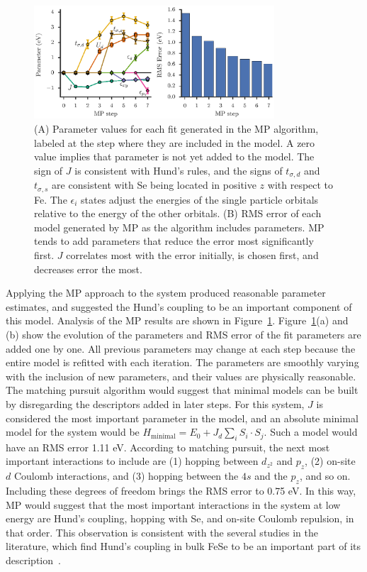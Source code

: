 \begin{figure}
  \centering
  \includegraphics[width=0.8\textwidth]{./Figures/fese.eps}
  \caption{
    \label{fig:fese} 
    (A) Parameter values for each fit generated in the MP algorithm, labeled at the step where they are included in the model. 
    A zero value implies that parameter is not yet added to the model.
    The sign of $J$ is consistent with Hund's rules, and the signs of $t_{\sigma,d}$ and $t_{\sigma,s}$ are consistent with Se being located in positive $z$ with respect to Fe. 
    The $\epsilon_i$ states adjust the energies of the single particle orbitals relative to the energy of the other orbitals.
    (B) RMS error of each model generated by MP as the algorithm includes parameters. 
    MP tends to add parameters that reduce the error most significantly first. 
    $J$ correlates most with the error initially, is chosen first, and decreases error the most.
  }
\end{figure}

Applying the MP approach to the system produced reasonable parameter estimates, and suggested the Hund's coupling to be an important component of this model.
Analysis of the MP results are shown in Figure~\ref{fig:fese}. 
Figure~\ref{fig:fese}(a) and (b) show the evolution of the parameters and RMS error of the fit parameters are added one by one.
All previous parameters may change at each step because the entire model is refitted with  each iteration.
The parameters are smoothly varying with the inclusion of new parameters, and their values are physically reasonable.
The matching pursuit algorithm would suggest that minimal models can be built by disregarding the descriptors added in later steps.
For this system, $J$ is considered the most important parameter in the model, and an absolute minimal model for the system would be $H_\text{minimal} = E_0 + J_d \sum_i S_i \cdot S_j$. 
Such a model would have an RMS error 1.11 eV. 
According to matching pursuit, the next most important interactions to include are (1) hopping between $d_{z^2}$ and $p_z$, (2) on-site $d$ Coulomb interactions, and (3) hopping between the $4s$ and the $p_z$, and so on. 
Including these degrees of freedom brings the RMS error to 0.75 eV.
In this way, MP would suggest that the most important interactions in the system at low energy are Hund's coupling, hopping with Se, and on-site Coulomb repulsion, in that order.
This observation is consistent with the several studies in the literature, which find Hund's coupling in bulk FeSe to be an important part of its description~\cite{demedici_hunds_2011,de_medici_janus-faced_2011,georges_strong_2013,busemeyer_competing_2016}.

